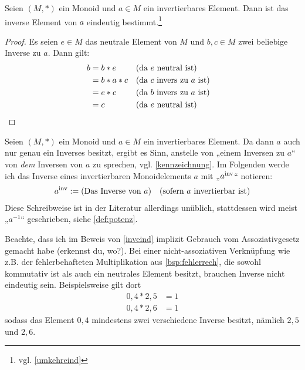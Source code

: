 \begin{satz} \label{inveind}
    Seien $(M,*)$ ein Monoid und $a\in M$ ein invertierbares Element. Dann ist das inverse Element von $a$ eindeutig bestimmt.\footnote{vgl. \cref{umkehreind}}
\end{satz}
\begin{proof}
    Es seien $e\in M$ das neutrale Element von $M$ und $b,c\in M$ zwei beliebige Inverse zu $a$. Dann gilt:
    \begin{align*}
        b & = b*e && (\text{da $e$ neutral ist}) && \\
        & = b* a*c && (\text{da $c$ invers zu $a$ ist}) && \\
        & = e*c && (\text{da $b$ invers zu $a$ ist}) && \\
        & = c && (\text{da $e$ neutral ist}) && \qedhere
    \end{align*}
\end{proof}


\begin{nota} \label{dasinverse}
    Seien $(M,*)$ ein Monoid und $a\in M$ ein invertierbares Element. Da dann $a$ auch nur genau ein Inverses besitzt, ergibt es Sinn, anstelle von „einem Inversen zu $a$“ von \emph{dem} Inversen von $a$ zu sprechen, vgl. \cref{kennzeichnung}. Im Folgenden werde ich das Inverse eines invertierbaren Monoidelements $a$ mit „$a^{\mathrm{inv}}$“ notieren:
    \begin{align*}
         a^{\mathrm{inv}} := (\text{Das Inverse von $a$}) && (\text{sofern $a$ invertierbar ist})
    \end{align*}
    Diese Schreibweise ist in der Literatur allerdings unüblich, stattdessen wird meist „$a^{-1}$“ geschrieben, siehe \cref{def:potenz}.
\end{nota}


\begin{bem}[*]
    Beachte, dass ich im Beweis von \cref{inveind} implizit Gebrauch vom Assoziativgesetz gemacht habe (erkennst du, wo?). Bei einer nicht-assoziativen Verknüpfung wie z.B. der fehlerbehafteten Multiplikation aus \cref{bsp:fehlerrech}, die sowohl kommutativ ist als auch ein neutrales Element besitzt, brauchen Inverse nicht eindeutig sein. Beispielsweise gilt dort
    \begin{align*}
        0{,}4 * 2{,}5 & = 1 \\
        0{,}4 * 2{,}6 & = 1
    \end{align*}
    sodass das Element $0{,}4$ mindestens zwei verschiedene Inverse besitzt, nämlich $2{,}5$ und $2{,}6$.
\end{bem}


